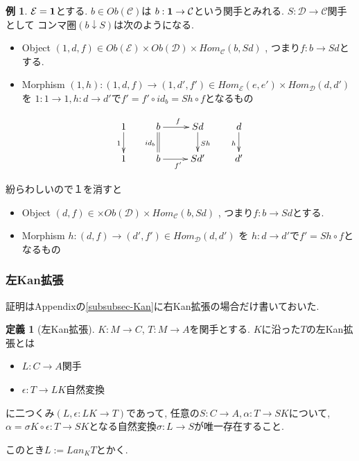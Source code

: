 \documentclass[dvipdfmx,a4paper,11pt]{article}
\theoremstyle{definition}
\newtheorem{dfn}[thm]{定義}
\newtheorem{exa}[thm]{例}
\begin{document}
\begin{exa}
$\mathcal{E}={\bf 1}$とする.
$b \in Ob(\mathcal{C})$は
$b :  {\bf 1} \to \mathcal{C}$という関手とみれる. 
$S : \mathcal{D} \to \mathcal{C}$関手として
コンマ圏$(b \downarrow S)$は次のようになる. 
\begin{itemize}
\item Object $(1,d,f) \in Ob(\mathcal{E}) \times Ob(\mathcal{D}) \times Hom_{\mathcal{C}}(b, Sd)$ , つまり$f : b \to Sd$とする. 
\item Morphism $(1,h) : (1,d,f)  \to (1,d',f') \in Hom_{\mathcal{E}}(e,e') \times Hom_{\mathcal{D}}(d,d') $ を $1 : 1 \to 1, h: d \to d'$で$f' = f' \circ id_b = Sh \circ f$となるもの
\end{itemize}

\begin{equation*}
\xymatrix@C=25pt@R=20pt{
1 \ar@{->}[d] _{1}&b\ar@{=}[d]_{id_b}  \ar@{->}[r]^{f} & Sd\ar@{->}[d]^{Sh} &d\ar@{->}[d]_{h}\\
1&b\ar@{->}[r]_{f'} &Sd'&d' \\   
}
\end{equation*}

紛らわしいので１を消すと
\begin{itemize}
\item Object $(d,f) \in \times Ob(\mathcal{D}) \times Hom_{\mathcal{C}}(b, Sd)$ , つまり$f : b \to Sd$とする. 
\item Morphism $h : (d,f)  \to (d',f') \in Hom_{\mathcal{D}}(d,d') $ を 
$h: d \to d'$で$f'  = Sh \circ f$となるもの
\end{itemize}

\end{exa}


\subsubsection{左Kan拡張}
証明はAppendixの\ref{subsubsec-Kan}に右Kan拡張の場合だけ書いておいた. 

 \begin{tcolorbox}
 [colback = white, colframe = green!35!black, fonttitle = \bfseries,breakable = true]
\begin{dfn}[左Kan拡張]
$K : M \to C$, $T : M \to A$を関手とする.
$K$に沿った$T$の左Kan拡張とは
\begin{itemize}
\item $L : C \to A$関手
\item $\epsilon :  T \to LK$自然変換
\end{itemize}
に二つくみ$(L, \epsilon : LK \to T)$であって, 
任意の$S : C \to A, \alpha :  T \to SK $について, $\alpha = \sigma K \circ \epsilon:  T \to SK$となる自然変換$\sigma : L \to S$が唯一存在すること. 

このとき$L := Lan_{K}T$とかく. 
\end{dfn}
\end{tcolorbox}
\end{document}
